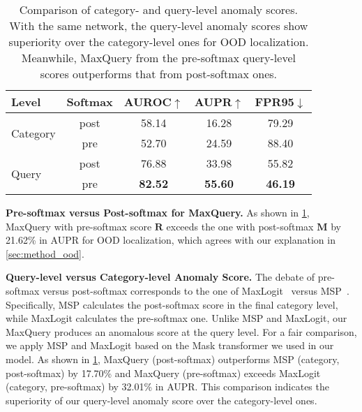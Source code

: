 \documentclass[10pt,twocolumn,letterpaper]{article}
\begin{document}
\begin{table}[t]
\centering
\begin{tabular}{l|c|ccc}
\hline
          Level                      & Softmax     & AUROC$\uparrow$ & AUPR$\uparrow$ & FPR95$\downarrow$ \\
                                \hline
\multirow{2}{*}{Category} & post &  58.14     & 16.28     &  79.29      \\
                          & pre  &  52.70     & 24.59     &  88.40      \\
                                \hline
\multirow{2}{*}{Query}    & post &  76.88     &  33.98    &  55.82     \\
                          & pre  &     \textbf{ 82.52} &\textbf{55.60} &\textbf{46.19 }  \\
                                \hline
\end{tabular}
\caption{Comparison of category- and query-level anomaly scores. With the same network, the query-level anomaly scores show superiority over the category-level ones for OOD localization. Meanwhile, MaxQuery from the pre-softmax query-level scores outperforms that from post-softmax ones.} 
\label{tab:ablation-score}
\vspace{-4mm}
\end{table}

{\bf Pre-softmax versus Post-softmax for MaxQuery.} 
As shown in \cref{tab:ablation-score}, MaxQuery with pre-softmax score $\mathbf{R}$ exceeds the one with post-softmax $\mathbf{M}$ by 21.62\% in AUPR for OOD localization, which agrees with our explanation in \cref{sec:method_ood}.

{\bf Query-level versus Category-level Anomaly Score.}
The debate of pre-softmax versus post-softmax corresponds to the one of MaxLogit~\cite{hendrycks2016baseline} versus MSP~\cite{hendrycks2019scaling}. Specifically, MSP calculates the post-softmax score in the final category level, while MaxLogit calculates the pre-softmax one. Unlike MSP and MaxLogit, our MaxQuery produces an anomalous score at the query level. For a fair comparison, we apply MSP and MaxLogit based on the Mask transformer we used in our model. As shown in \cref{tab:ablation-score},  MaxQuery (post-softmax) outperforms MSP (category, post-softmax) by 17.70\% and MaxQuery (pre-softmax) exceeds MaxLogit (category, pre-softmax) by 32.01\% in AUPR. This comparison indicates the superiority of our query-level anomaly score over the category-level ones.
\end{document}
